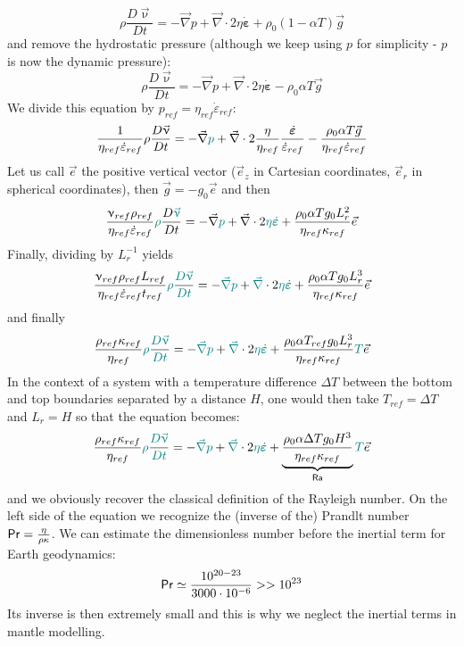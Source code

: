 \[
\rho \frac{D \vec\upnu}{D t}
=
-\vec\nabla p + \vec\nabla \cdot 2 \eta \dot{\bm\varepsilon}
+ \rho_0(1-\alpha T) \vec{g} 
\]
and remove the hydrostatic pressure (although we keep using $p$ for simplicity - $p$ is now the dynamic pressure):
\[
\rho \frac{D \vec\upnu}{D t}
=
-\vec\nabla p + \vec\nabla \cdot 2 \eta \dot{\bm\varepsilon}
- \rho_0\alpha T \vec{g} 
\]
We divide this equation by $p_{ref}=\eta_{ref}\dot{\varepsilon}_{ref}$:
\[
\frac{1}{\eta_{ref}\dot{\varepsilon}_{ref}} \rho
\frac{D \vec\upnu}{D t} 
=
-\vec\nabla {\color{teal}p} + \vec\nabla \cdot 2 \frac{\eta}{\eta_{ref}} \frac{\dot{\bm\varepsilon}}{\dot{\varepsilon}_{ref}}
- \frac{\rho_0\alpha T \vec{g}}{\eta_{ref} \dot{\varepsilon}_{ref}} 
\]
Let us call $\vec{e}$ the positive vertical vector ($\vec{e}_z$ in Cartesian coordinates, $\vec{e}_r$ in spherical coordinates), then 
$\vec{g} = -g_0 \vec{e}$ and then 
\[
\frac{\upnu_{ref} \rho_{ref}}{\eta_{ref}\dot{\varepsilon}_{ref}}
{\color{teal}\rho}\frac{D {\color{teal}\vec\upnu}}{D t}
=
-\vec\nabla {\color{teal}p} + \vec\nabla \cdot 2 {\color{teal} \eta} {\color{teal} \dot{\bm\varepsilon}}
+ \frac{\rho_0\alpha T g_0 L_r^2}{\eta_{ref} \kappa_{ref}} \vec{e}
\]
Finally, dividing by $L_r^{-1}$ yields
\[
\frac{\upnu_{ref} \rho_{ref} L_{ref}}{\eta_{ref}\dot{\varepsilon}_{ref}  t_{ref} }
{\color{teal}\rho} \frac{{\color{teal} D \vec\upnu}}{\color{teal} D t}
=
-{\color{teal} \vec\nabla} {\color{teal}p} + {\color{teal} \vec\nabla} \cdot 2 {\color{teal} \eta} {\color{teal} \dot{\bm\varepsilon}}
+ \frac{\rho_0\alpha T g_0 L_r^3}{\eta_{ref} \kappa_{ref}} \vec{e}
\]
and finally 
\[
\frac{\rho_{ref} \kappa_{ref}}{\eta_{ref}}
{\color{teal}\rho} \frac{{\color{teal} D \vec\upnu}}{\color{teal} D t}
=
-{\color{teal} \vec\nabla} {\color{teal}p} + {\color{teal} \vec\nabla} \cdot 2 {\color{teal} \eta} {\color{teal} \dot{\bm\varepsilon}}
+ \frac{\rho_0\alpha T_{ref} g_0 L_r^3}{\eta_{ref} \kappa_{ref}} {\color{teal} T} \vec{e}
\]
In the context of a system with a temperature difference $\Delta T$ 
between the bottom and top boundaries separated by a distance $H$, one would then take $T_{ref} = \Delta T$ and $L_r=H$ so that the equation becomes:
\[
\frac{\rho_{ref} \kappa_{ref}}{\eta_{ref}}
{\color{teal}\rho} \frac{{\color{teal} D \vec\upnu}}{\color{teal} D t}
=
-{\color{teal} \vec\nabla} {\color{teal}p} + {\color{teal} \vec\nabla} \cdot 2 {\color{teal} \eta} {\color{teal} \dot{\bm\varepsilon}}
+ \underbrace{\frac{\rho_0\alpha \Delta T g_0 H^3}{\eta_{ref} \kappa_{ref}} }_{{\mathsf{Ra}}} {\color{teal} T}\vec{e}
\]
and we obviously recover the classical definition of the Rayleigh number.
On the left side of the equation we recognize the (inverse of the) Prandlt number ${\mathsf{Pr}}=\frac{\eta}{\rho \kappa}$. 
We can estimate the dimensionless number before the inertial term for Earth
geodynamics:
\[
{\mathsf{Pr}} \simeq \frac{10^{20-23}}{3000 \cdot 10^{-6}} >> 10^{23}
\]
Its inverse is then extremely small and this is why we neglect the inertial terms
in mantle modelling.


